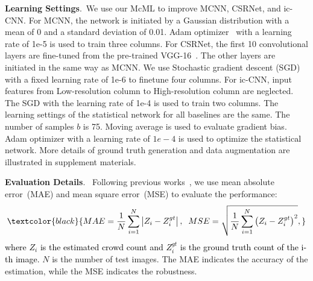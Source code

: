\documentclass[sigconf]{acmart}
\newcommand{\ljx}[1]{\textcolor{black}{#1}}
\newcommand{\beq}{\begin{equation}}
\newcommand{\eeq}{\end{equation}}
\begin{document}
\noindent\textbf{Learning Settings}.~We use our McML to improve MCNN, CSRNet, and ic-CNN.
For MCNN, the network is initiated by a Gaussian distribution with a mean of 0 and a standard deviation of 0.01. 
Adam optimizer\ljx{~\cite{adam-14}} with a learning rate of 1e-5 is used to train three columns. 
For CSRNet, the first 10 convolutional layers are fine-tuned from the pre-trained VGG-16~\cite{vgg-14}. 
The other layers are initiated in the same way as MCNN. 
We use Stochastic gradient descent (SGD) with a fixed learning rate of 1e-6 to finetune four columns.
For ic-CNN, input features from Low-resolution column to High-resolution column are neglected.
The SGD with the learning rate of 1e-4 is used to train two columns. 
The learning settings of the statistical network for all baselines are the same.
The number of samples $b$ is 75.
Moving average is used to evaluate gradient bias.
Adam optimizer with a learning rate of $1e-4$ is used to optimize the statistic\ljx{al} network.
More details of ground truth generation and data augmentation are illustrated in supplement materials.

\noindent\textbf{Evaluation Details}.~
Following previous works~\cite{MCNN-16, CSRNet-18, deep-training-ICCNN-18},
we use mean absolute error~(MAE) and mean square error~(MSE) to evaluate the performance:
\vspace{-2mm}
\beq
\normalsize
\label{eq:mae-mse}
\ljx{MAE=\frac{1}{N}\sum_{i=1}^N\left | Z_i-Z_i^{gt} \right |,\;\;
MSE=\sqrt{\frac{1}{N}\sum_{i=1}^N\left ( Z_i-Z_i^{gt} \right )^2},}
\eeq
\ljx{where $Z_i$ is the estimated crowd count and $Z_i^{gt}$ is the ground truth count of the i-th image.}
$N$ is the number of test images. 
The MAE indicates the accuracy of the estimation, while the MSE indicates the robustness. 
\end{document}
